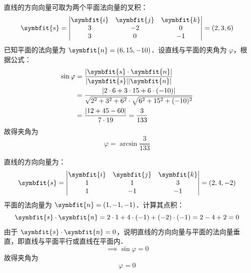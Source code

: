 \begin{solution}

    直线的方向向量可取为两个平面法向量的叉积：
    \begin{equation}
        \symbfit{s} = \begin{vmatrix} \symbfit{i} & \symbfit{j} & \symbfit{k} \\ 3 & -2 & 0 \\ 3 & 0 & -1 \end{vmatrix} = (2, 3, 6)
    \end{equation}
    已知平面的法向量为 $\symbfit{n} = (6, 15, -10)$．设直线与平面的夹角为 $\varphi$，根据公式：
    \begin{equation}
        \begin{aligned}
            \sin \varphi & = \frac{|\symbfit{s} \cdot \symbfit{n}|}{|\symbfit{s}| |\symbfit{n}|}                                       \\
                         & = \frac{|2 \cdot 6 + 3 \cdot 15 + 6 \cdot (-10)|}{\sqrt{2^2 + 3^2 + 6^2} \cdot \sqrt{6^2 + 15^2 + (-10)^2}} \\
                         & = \frac{|12 + 45 - 60|}{7 \cdot 19} = \frac{3}{133}
        \end{aligned}
    \end{equation}
    故得夹角为
    \begin{equation}
        \boxed{\varphi = \arcsin \frac{3}{133}}
    \end{equation}


    直线的方向向量为：
    \begin{equation}
        \symbfit{s} = \begin{vmatrix} \symbfit{i} & \symbfit{j} & \symbfit{k} \\ 1 & 1 & 3 \\ 1 & -1 & -1 \end{vmatrix} = (2, 4, -2)
    \end{equation}
    平面的法向量为 $\symbfit{n} = (1, -1, -1)$．计算其点积：
    \begin{equation}
        \symbfit{s} \cdot \symbfit{n} = 2 \cdot 1 + 4 \cdot (-1) + (-2) \cdot (-1) = 2 - 4 + 2 = 0
    \end{equation}
    由于 $\symbfit{s} \cdot \symbfit{n} = 0$，说明直线的方向向量与平面的法向量垂直，即直线与平面平行或直线在平面内．
    \begin{equation}
        \implies \sin \varphi = 0
    \end{equation}
    故得夹角为
    \begin{equation}
        \boxed{\varphi = 0}
    \end{equation}
\end{solution}


